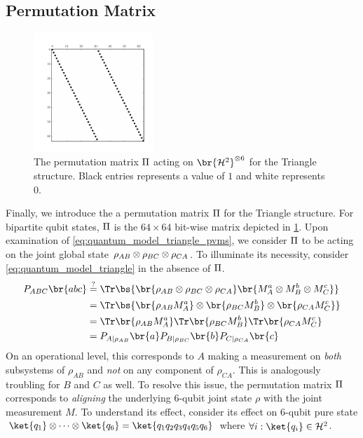 \documentclass[aps, 10pt, english, twoside, pra, nofootinbib, tightenlines, longbibliography, superscriptaddress]{revtex4-1}
\begin{document}
    \subsection{Permutation Matrix}
    \label{sec:perm_matrix}
    \begin{figure}
        \centering
        \includegraphics[trim={1cm 1.2cm 1.0cm 1cm},clip,width=0.4\textwidth]{../../figures/perm_mtrx.pdf}
        \caption{The permutation matrix $\Pi$ acting on $\br{\Hilb^2}^{\otimes 6}$ for the Triangle structure. Black entries represents a value of $1$ and white represents $0$.}
        \label{fig:perm_mtrx}
    \end{figure}
    Finally, we introduce the a permutation matrix $\Pi$ for the Triangle structure. For bipartite qubit states, $\Pi$ is the $64\times64$ bit-wise matrix depicted in \cref{fig:perm_mtrx}. Upon examination of \cref{eq:quantum_model_triangle_pvms}, we consider $\Pi$ to be acting on the joint global state $\rho_{AB} \otimes \rho_{BC} \otimes \rho_{CA}$. To illuminate its necessity, consider \cref{eq:quantum_model_triangle} in the absence of $\Pi$.
    \begin{align*}
    \prob[\p{ABC}]\br{abc} &\stackrel{?}{=} \Tr\bs{\br{\rho_{\p{AB}} \otimes \rho_{\p{BC}} \otimes \rho_{\p{CA}}} \br{M^a_{\p{A}}\otimes M^b_{\p{B}} \otimes M^c_{\p{C}}}}\\
    &= \Tr\bs{\br{\rho_{\p{AB}}M^a_{\p{A}}}\otimes\br{\rho_{\p{BC}}M^b_{\p{B}}}\otimes\br{\rho_{\p{CA}}M^c_{\p{C}}}}\\
    &= \Tr\br{\rho_{\p{AB}}M^a_{\p{A}}}\Tr\br{\rho_{\p{BC}}M^b_{\p{B}}}\Tr\br{\rho_{\p{CA}}M^c_{\p{C}}}\\
    &= \prob[\p{A}\mid \rho_{\p{AB}}]\br{a}\prob[\p{B}\mid \rho_{\p{BC}}]\br{b}\prob[\p{C}\mid \rho_{\p{CA}}]\br{c}
    \end{align*}
    On an operational level, this corresponds to $A$ making a measurement on \textit{both} subsystems of $\rho_{AB}$ and \textit{not} on any component of $\rho_{CA}$. This is analogously troubling for $B$ and $C$ as well. To resolve this issue, the permutation matrix $\Pi$ corresponds to \textit{aligning} the underlying $6$-qubit joint state $\rho$ with the joint measurement $M$. To understand its effect, consider its effect on $6$-qubit pure state $\ket{q_1} \otimes \cdots \otimes \ket{q_6} = \ket{q_1q_2q_3q_4q_5q_6}$ where $\forall i : \ket{q_i} \in \Hilb^2$.
\end{document}
